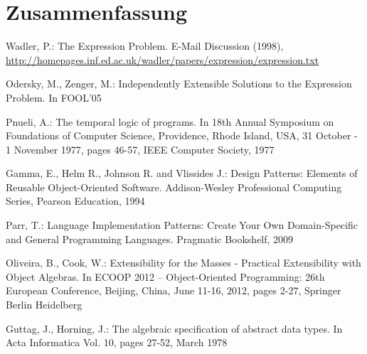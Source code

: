\documentclass{llncs}
\begin{document}
\section{Zusammenfassung} \label{sec:conclusion}


%
%
\begin{thebibliography}{5}
%

Wadler, P.:
The Expression Problem.
E-Mail Discussion (1998),
\url{http://homepages.inf.ed.ac.uk/wadler/papers/expression/expression.txt}

Odersky, M., Zenger, M.:
Independently Extensible Solutions to the Expression Problem. 
In FOOL'05

Pnueli, A.:
The temporal logic of programs.
In 18th Annual Symposium on Foundations of Computer Science, Providence, Rhode Island, USA, 31 October - 1 November 1977, pages 46-57, IEEE Computer Society, 1977

Gamma, E., Helm R., Johnson R. and Vlissides J.:
Design Patterns: Elements of Reusable Object-Oriented Software.
Addison-Wesley Professional Computing Series, Pearson Education, 1994

Parr, T.:
Language Implementation Patterns: Create Your Own Domain-Specific and General Programming Languages.
Pragmatic Bookshelf, 2009

Oliveira, B., Cook, W.:
Extensibility for the Masses - Practical Extensibility with Object Algebras.
In ECOOP 2012 -- Object-Oriented Programming: 26th European Conference, Beijing, China, June 11-16, 2012, pages 2-27, Springer Berlin Heidelberg

Guttag, J., Horning, J.:
The algebraic specification of abstract data types.
In Acta Informatica Vol. 10, pages 27-52, March 1978

\end{thebibliography}
\end{document}
